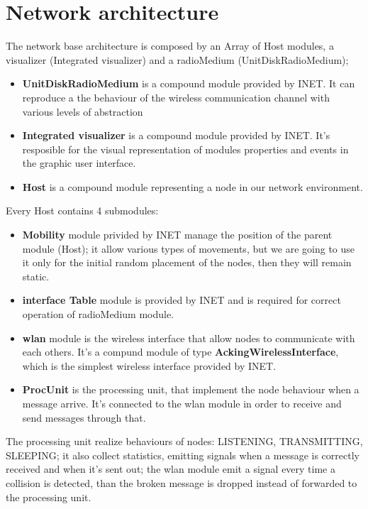 \section{Network architecture}
The network base architecture is composed by an Array of Host modules, a visualizer (Integrated visualizer) and a radioMedium (UnitDiskRadioMedium);
\begin{itemize}
    \item \textbf{UnitDiskRadioMedium} is a compound module provided by INET. It can reproduce a the behaviour of the wireless communication 
    channel with various levels of abstraction
    \item \textbf{Integrated visualizer} is a compound module provided by INET. It's resposible for the visual representation of modules properties 
    and events in the graphic user interface.
    \item \textbf{Host} is a compound module representing a node in our network environment. 
\end{itemize}
Every Host contains 4 submodules:
\begin{itemize}
    \item \textbf{Mobility} module privided by INET manage the position of the parent module (Host); it allow various types of movements,
        but we are going to use it only for the initial random placement of the nodes, then they will remain static.
    \item \textbf{interface Table} module is provided by INET and is required for correct operation of radioMedium module.
    \item \textbf{wlan} module is the wireless interface that allow nodes to communicate with each others. It's a compund module of type 
        \textbf{AckingWirelessInterface}, which is the simplest wireless interface provided by INET.
    \item \textbf{ProcUnit} is the processing unit, that implement the node behaviour when a message arrive. It's connected to
    the wlan module in order to receive and send messages through that.
\end{itemize}

The processing unit realize behaviours of nodes: LISTENING, TRANSMITTING, SLEEPING; it also collect statistics, emitting signals when 
a message is correctly received and when it's sent out; the wlan module emit a signal every time a collision is detected, than the broken
message is dropped instead of forwarded to the processing unit. 